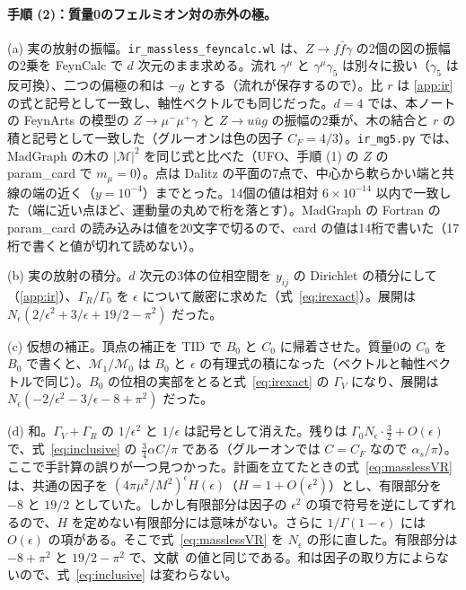 \documentclass[a4paper,10pt]{ltjsarticle}
\begin{document}
\paragraph{手順 (2)：質量0のフェルミオン対の赤外の極。}(a) 実の放射の振幅。\texttt{ir\_massless\_feyncalc.wl} は、$Z\to f\bar f\gamma$ の2個の図の振幅の2乗を FeynCalc で $d$ 次元のまま求める。流れ $\gamma^\mu$ と $\gamma^\mu\gamma_5$ は別々に扱い（$\gamma_5$ は反可換）、二つの偏極の和は $-g$ とする（流れが保存するので）。比 $r$ は \ref{app:ir} の式と記号として一致し、軸性ベクトルでも同じだった。$d=4$ では、本ノートの FeynArts の模型の $Z\to\mu^-\mu^+\gamma$ と $Z\to u\bar ug$ の振幅の2乗が、木の結合と $r$ の積と記号として一致した（グルーオンは色の因子 $C_F=4/3$）。\texttt{ir\_mg5.py} では、MadGraph の木の $|\mathcal M|^2$ を同じ式と比べた（UFO、手順 (1) の $Z$ の param\_card で $m_\mu=0$）。点は Dalitz の平面の7点で、中心から軟らかい端と共線の端の近く（$y=10^{-4}$）までとった。14個の値は相対 $6\times10^{-14}$ 以内で一致した（端に近い点ほど、運動量の丸めで桁を落とす）。MadGraph の Fortran の param\_card の読み込みは値を20文字で切るので、card の値は14桁で書いた（17桁で書くと値が切れて読めない）。

(b) 実の放射の積分。$d$ 次元の3体の位相空間を $y_{ij}$ の Dirichlet の積分にして（\ref{app:ir}）、$\Gamma_R/\Gamma_0$ を $\epsilon$ について厳密に求めた（式~\eqref{eq:irexact}）。展開は $N_\epsilon(2/\epsilon^2+3/\epsilon+19/2-\pi^2)$ だった。

(c) 仮想の補正。頂点の補正を TID で $B_0$ と $C_0$ に帰着させた。質量0の $C_0$ を $B_0$ で書くと、$\mathcal M_1/\mathcal M_0$ は $B_0$ と $\epsilon$ の有理式の積になった（ベクトルと軸性ベクトルで同じ）。$B_0$ の位相の実部をとると式~\eqref{eq:irexact} の $\Gamma_V$ になり、展開は $N_\epsilon(-2/\epsilon^2-3/\epsilon-8+\pi^2)$ だった。

(d) 和。$\Gamma_V+\Gamma_R$ の $1/\epsilon^2$ と $1/\epsilon$ は記号として消えた。残りは $\Gamma_0N_\epsilon\cdot\frac32+O(\epsilon)$ で、式~\eqref{eq:inclusive} の $\frac34\alpha C/\pi$ である（グルーオンでは $C=C_F$ なので $\alpha_s/\pi$）。ここで手計算の誤りが一つ見つかった。計画を立てたときの式~\eqref{eq:masslessVR} は、共通の因子を $(4\pi\mu^2/M^2)^\epsilon H(\epsilon)$（$H=1+O(\epsilon^2)$）とし、有限部分を $-8$ と $19/2$ としていた。しかし有限部分は因子の $\epsilon^2$ の項で符号を逆にしてずれるので、$H$ を定めない有限部分には意味がない。さらに $1/\Gamma(1-\epsilon)$ には $O(\epsilon)$ の項がある。そこで式~\eqref{eq:masslessVR} を $N_\epsilon$ の形に直した。有限部分は $-8+\pi^2$ と $19/2-\pi^2$ で、文献~\cite{esw96}の値と同じである。和は因子の取り方によらないので、式~\eqref{eq:inclusive} は変わらない。
\end{document}
